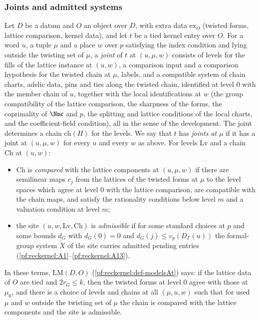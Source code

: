 \subsubsection{Joints and admitted systems}\label{pf:reckernel:sec-joints}
Let $D$ be a datum and $O$ an object over $D$, with extra data $\mathrm{ex}_O$ (twisted forms, lattice comparison, kernel
data), and let $t$ be a tied kernel entry over $O$. For a word $u$, a tuple $\mu$ and a place $w$ over $p$ satisfying the
index condition and lying outside the twisting set of $\mu$, a \emph{joint} of $t$ at $(u,\mu,w)$ consists of levels for
the fills of the lattice instance at $(u,w)$, a comparison input and a comparison hypothesis for the twisted chain at
$\mu$, labels, and a compatible system of chain charts, adelic data, pins and ties along the twisted chain, identified at
level $0$ with the member chain of $u$, together with the local identifications at $w$ (the group compatibility of the
lattice comparison, the sharpness of the forms, the coprimality of $\Nm\mathfrak c$ and $p$, the splitting and lattice
conditions of the local charts, and the coefficient-field condition), all in the sense of the development. The joint
determines a chain $\mathrm{ch}(H)$ for the levels. We say that $t$ has \emph{joints at $\mu$} if it has a joint at
$(u,\mu,w)$ for every $u$ and every $w$ as above. For levels $\mathrm{Lv}$ and a chain $\mathrm{Ch}$ at $(u,w)$:
\begin{itemize}
\item $\mathrm{Ch}$ is \emph{compared} with the lattice components at $(u,\mu,w)$ if there are semilinear maps $c_j$ from the
  lattices of the twisted forms at $\mu$ to the level spaces which agree at level $0$ with the lattice comparison, are
  compatible with the chain maps, and satisfy the rationality conditions below level $m$ and a valuation condition at
  level $m$;
\item the site $(u,w,\mathrm{Lv},\mathrm{Ch})$ is \emph{admissible} if for some standard choices at $p$ and some bounds
  $d_G$ with $d_G(0)=0$ and $d_G(j)\le v_p(D_\Gamma(u))$ the formal-group system $X$ of the site carries admitted pending
  entries (\ref{pf:reckernel:A1}--\ref{pf:reckernel:A13}).
\end{itemize}
In these terms, $\mathrm{LM}(D,O)$ (\cref{pf:reckernel:def-modelsAt}) says: if the lattice data of $O$ are tied and
$2r_G\le k$, then the twisted forms at level $0$ agree with those at $\mu_0$, and there is a choice of levels and chains
at all $(\mu,u,w)$ such that for used $\mu$ and $w$ outside the twisting set of $\mu$ the chain is compared with the
lattice components and the site is admissible.

